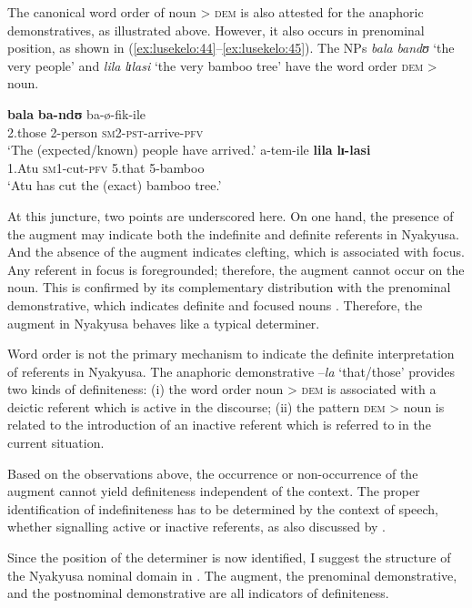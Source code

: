 \documentclass[output=paper]{langscibook}
\begin{document}
The canonical word order of noun > \textsc{dem} is also attested for the anaphoric demonstratives, as illustrated above. However, it also occurs in prenominal position, as shown in (\ref{ex:lusekelo:44}--\ref{ex:lusekelo:45}). The NPs \textit{bala} \textit{bandʊ} ‘the very people’ and \textit{lila} \textit{lɪlasi} ‘the very bamboo tree’ have the word order \textsc{dem} > noun. 

\ea%
    \label{ex:lusekelo:44}
\gll  \textbf{bala}   \textbf{ba-ndʊ}  {ba-ø-fik-ile}              \\
  2.those  2-person  \textsc{sm}2-\textsc{pst}-arrive-\textsc{pfv}  \\
\glt  ‘The (expected/known) people have arrived.’
\ex%
    \label{ex:lusekelo:45}
   {a-tem-ile}    \textbf{lila}   \textbf{lɪ{}-lasi}  \\
  1.Atu  \textsc{sm}1-cut-\textsc{pfv}  5.that   5-bamboo     \\
\glt  ‘Atu has cut the (exact) bamboo tree.’
\z

At this juncture, two points are underscored here. On one hand, the presence of the augment may indicate both the indefinite and definite referents in Nyakyusa. And the absence of the augment indicates clefting, which is associated with focus. Any referent in focus is foregrounded; therefore, the augment cannot occur on the noun. This is confirmed by its complementary distribution with the prenominal demonstrative, which indicates definite and focused nouns \citep{Lyons1999}. Therefore, the augment in Nyakyusa behaves like a typical determiner. 

Word order is not the primary mechanism to indicate the definite interpretation of referents in Nyakyusa. The anaphoric demonstrative --\textit{la} ‘that/those’ provides two kinds of definiteness: (i) the word order noun > \textsc{dem} is associated with a deictic referent which is active in the discourse; (ii) the pattern \textsc{dem} > noun is related to the introduction of an inactive referent which is referred to in the current situation. 

Based on the observations above, the occurrence or non-occurrence of the augment cannot yield definiteness independent of the context. The proper identification of indefiniteness has to be determined by the context of speech, whether signalling active or inactive referents, as also discussed by \citet{Mwamzandi2014}.  

{Since the position of the determiner is now identified, I suggest the structure of the Nyakyusa nominal domain in . The augment, the prenominal demonstrative, and the postnominal demonstrative are all indicators of definiteness.} 
\end{document}
